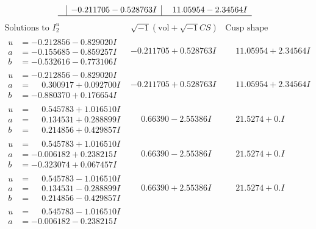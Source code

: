 \documentclass[1p]{elsarticle_modified}
\theoremstyle{definition}
\newcommand{\I}{\sqrt{-1}}
\begin{document}
$$\begin{array}{c|c|c}
 & -0.211705 - 0.528763 I & \phantom{-}11.05954 - 2.34564 I\\
 \hline 
 \end{array}$$\newpage$$\begin{array}{c|c|c}  
\text{Solutions to }I^u_{2}& \I (\text{vol} + \sqrt{-1}CS) & \text{Cusp shape}\\
 \hline 
\begin{aligned}
u &= -0.212856 - 0.829020 I \\
a &= -0.155685 - 0.859257 I \\
b &= -0.532616 - 0.773106 I\end{aligned}
 & -0.211705 + 0.528763 I & \phantom{-}11.05954 + 2.34564 I \\ \hline\begin{aligned}
u &= -0.212856 - 0.829020 I \\
a &= \phantom{-}0.300917 + 0.092700 I \\
b &= -0.880370 + 0.176654 I\end{aligned}
 & -0.211705 + 0.528763 I & \phantom{-}11.05954 + 2.34564 I \\ \hline\begin{aligned}
u &= \phantom{-}0.545783 + 1.016510 I \\
a &= \phantom{-}0.134531 + 0.288899 I \\
b &= \phantom{-}0.214856 + 0.429857 I\end{aligned}
 & \phantom{-}0.66390 - 2.55386 I & \phantom{-}21.5274 + 0. I\phantom{ +0.000000I} \\ \hline\begin{aligned}
u &= \phantom{-}0.545783 + 1.016510 I \\
a &= -0.006182 + 0.238215 I \\
b &= -0.323074 + 0.067457 I\end{aligned}
 & \phantom{-}0.66390 - 2.55386 I & \phantom{-}21.5274 + 0. I\phantom{ +0.000000I} \\ \hline\begin{aligned}
u &= \phantom{-}0.545783 - 1.016510 I \\
a &= \phantom{-}0.134531 - 0.288899 I \\
b &= \phantom{-}0.214856 - 0.429857 I\end{aligned}
 & \phantom{-}0.66390 + 2.55386 I & \phantom{-}21.5274 + 0. I\phantom{ +0.000000I} \\ \hline\begin{aligned}
u &= \phantom{-}0.545783 - 1.016510 I \\
a &= -0.006182 - 0.238215 I \\

\end{aligned}
\end{array}$$
\end{document}
